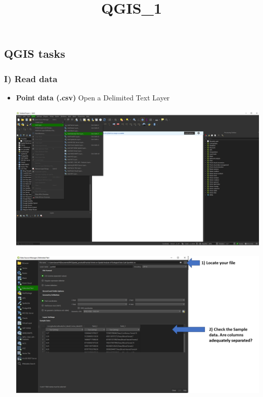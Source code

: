 \documentclass[
  letterpaper,
  DIV=11,
  numbers=noendperiod]{scrartcl}
\title{QGIS\_1}
\author{}
\date{}
\begin{document}
\maketitle
\ifdefined\Shaded\renewenvironment{Shaded}{\begin{tcolorbox}[breakable, boxrule=0pt, interior hidden, enhanced, frame hidden, borderline west={3pt}{0pt}{shadecolor}, sharp corners]}{\end{tcolorbox}}\fi

\hypertarget{qgis-tasks}{%
\subsection{QGIS tasks}\label{qgis-tasks}}

\hypertarget{i-read-data}{%
\subsubsection{I) Read data}\label{i-read-data}}

\begin{itemize}
\item
  \textbf{Point data (.csv)} Open a Delimited Text Layer

  \includegraphics{Lab1/qgis_ss/QGIS_ss1.png}

  \includegraphics{Lab1/qgis_ss/QGIS_ss2.png}
\end{itemize}
\end{document}
